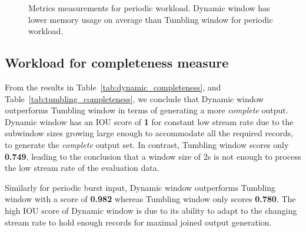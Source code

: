 \begin{figure}
    \caption[Metrics measurements for periodic workload]
    {Metrics measurements for periodic workload. Dynamic window 
    has lower memory usage on average than Tumbling window for
periodic workload. }%
    \label{fig:periodic_measurement}
\end{figure}

\subsection{Workload for completeness measure}%
\label{sec:Workload for completeness measure}

From the results in Table~\ref{tab:dynamic_completeness}, and 
Table~\ref{tab:tumbling_completeness}, we conclude that Dynamic window 
outperforms Tumbling window in terms of generating a more \emph{complete} output. 
Dynamic window has an IOU score of \textbf{1} for constant low stream rate
due to the subwindow sizes growing large 
enough to accommodate all the required records, to generate the \emph{complete} output set. In contrast, Tumbling window scores only \textbf{0.749}, leading to 
the conclusion that a window size of 2s is not enough to process the low stream rate 
of the evaluation data. 

Similarly for periodic burst input, Dynamic window outperforms Tumbling window with a
score of \textbf{0.982} whereas Tumbling window only scores \textbf{0.780}. The high IOU 
score of Dynamic window is due to its ability  
to adapt to the changing stream rate to hold enough 
records for maximal joined output generation.


\begin{table}[htbp]
    \centering
\caption{Dynamic window's completeness measurement.}
\label{tab:dynamic_completeness}
\end{table}

\begin{table}[htbp]
    \centering
\caption{Tumbling window's completeness measurement. }
\label{tab:tumbling_completeness}
\end{table}



